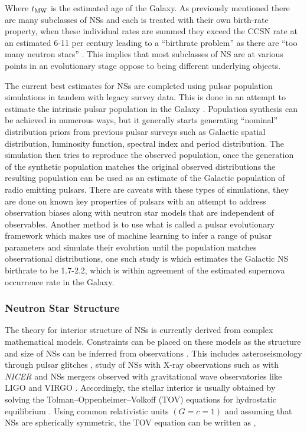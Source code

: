 Where $t_{\rm{MW}}$ is the estimated age of the Galaxy. As previously mentioned there are many subclasses of NSs and each is treated with their own birth-rate property, when these individual rates are summed they exceed the CCSN rate at an estimated 6-11 per century leading to a ``birthrate problem'' as there are ``too many neutron stars'' \citep{keane_birthrates_2008}. This implies that most subclasses of NS are at various points in an evolutionary stage oppose to being different underlying objects. 

The current best estimates for NSs are completed using pulsar population simulations in tandem with legacy survey data. This is done in an attempt to estimate the intrinsic pulsar population in the Galaxy \citep[e.g.,][]{faucher-giguere_birth_2006, bates_psrpoppy_2014,keane_square_2025,pardo-araujo_radio_2025}. Population synthesis can be achieved in numerous ways, but it generally starts generating ``nominal'' distribution priors from previous pulsar surveys such as Galactic spatial distribution, luminosity function, spectral index and period distribution. The simulation then tries to reproduce the observed population, once the generation of the synthetic population matches the original observed distributions the resulting population can be used as an estimate of the Galactic population of radio emitting pulsars. There are caveats with these types of simulations, they are done on known key properties of pulsars with an attempt to address observation biases along with neutron star models that are independent of observables. Another method is to 
use what is called a pulsar evolutionary framework which makes use of machine learning to infer a range of pulsar parameters and simulate their evolution until the population matches observational distributions, one such study is \citet{pardo-araujo_radio_2025} which estimates the Galactic NS birthrate to be 1.7-2.2, which is within agreement of the estimated supernova occurrence rate in the Galaxy.%

\subsubsection{Neutron Star Structure}

The theory for interior structure of NSs is currently derived from complex mathematical models. Constraints can be placed on these models as the structure and size of NSs can be inferred from observations \citep{miller_psr_2019}. This includes asteroseismology through pulsar glitches \citep{antonopoulou_pulsar_2022}, study of NSs with X-ray observations such as with \textit{NICER} and NSs mergers observed with gravitational wave observatories like LIGO and VIRGO \citep{hebeler_equation_2013}. Accordingly, the stellar interior is usually obtained by solving the Tolman–Oppenheimer–Volkoff (TOV) equations for hydrostatic equilibrium \citep{oppenheimer_massive_1939}. Using common relativistic units $(G=c=1)$ and assuming that NSs are spherically symmetric, the TOV equation can be written as \citep[pp. 124 - 126,][]{1983bhwd.book.....S}, 


